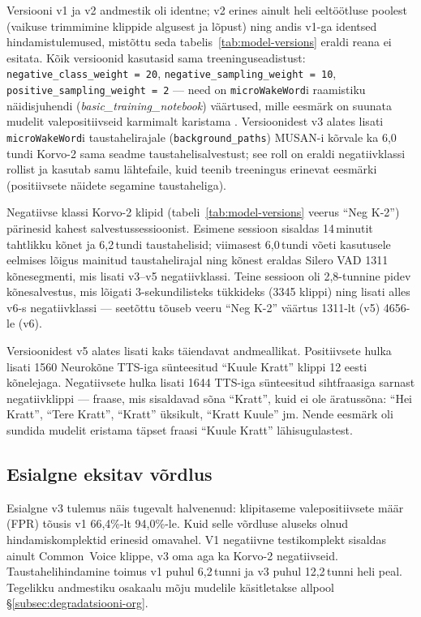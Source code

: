 Versiooni v1 ja v2 andmestik oli identne; v2 erines ainult heli eeltöötluse poolest (vaikuse trimmimine klippide algusest ja lõpust) ning andis v1-ga identsed hindamistulemused, mistõttu seda tabelis~\ref{tab:model-versions} eraldi reana ei esitata. Kõik versioonid kasutasid sama treeninguseadistust: \texttt{negative\_class\_weight\,=\,20}, \texttt{negative\_sampling\_weight\,=\,10}, \texttt{positive\_sampling\_weight\,=\,2} --- need on \texttt{microWakeWord}i raamistiku näidisjuhendi (\emph{basic\_training\_notebook}) väärtused, mille eesmärk on suunata mudelit valepositiivseid karmimalt karistama \cite{microwakeword2026}. Versioonidest v3 alates lisati \texttt{microWakeWord}i taustahelirajale (\texttt{background\_paths}) MUSAN-i kõrvale ka 6,0\,tundi Korvo-2 sama seadme taustahelisalvestust; see roll on eraldi negatiivklassi rollist ja kasutab samu lähtefaile, kuid teenib treeningus erinevat eesmärki (positiivsete näidete segamine taustaheliga).

Negatiivse klassi Korvo-2 klipid (tabeli~\ref{tab:model-versions} veerus \enquote{Neg K-2}) pärinesid kahest salvestussessioonist. Esimene sessioon sisaldas 14\,minutit tahtlikku kõnet ja 6,2\,tundi taustahelisid; viimasest 6,0\,tundi võeti kasutusele eelmises lõigus mainitud taustahelirajal ning kõnest eraldas Silero VAD 1311 kõnesegmenti, mis lisati v3--v5 negatiivklassi. Teine sessioon oli 2,8-tunnine pidev kõnesalvestus, mis lõigati 3-sekundilisteks tükkideks (3345 klippi) ning lisati alles v6-s negatiivklassi --- seetõttu tõuseb veeru \enquote{Neg K-2} väärtus 1311-lt (v5) 4656-le (v6).

Versioonidest v5 alates lisati kaks täiendavat andmeallikat. Positiivsete hulka lisati 1560 Neurokõne TTS-iga sünteesitud \enquote{Kuule Kratt} klippi 12 eesti kõnelejaga. Negatiivsete hulka lisati 1644 TTS-iga sünteesitud sihtfraasiga sarnast negatiivklippi --- fraase, mis sisaldavad sõna \enquote{Kratt}, kuid ei ole äratussõna: \enquote{Hei Kratt}, \enquote{Tere Kratt}, \enquote{Kratt} üksikult, \enquote{Kratt Kuule} jm. Nende eesmärk oli sundida mudelit eristama täpset fraasi \enquote{Kuule Kratt} lähisugulastest.

\subsection{Esialgne eksitav võrdlus}

Esialgne v3 tulemus näis tugevalt halvenenud: klipitaseme valepositiivsete määr (FPR) tõusis v1 66,4\%-lt 94,0\%-le. Kuid selle võrdluse aluseks olnud hindamiskomplektid erinesid omavahel. V1 negatiivne testikomplekt sisaldas ainult Common~Voice klippe, v3 oma aga ka Korvo-2 negatiivseid. Taustahelihindamine toimus v1 puhul 6,2\,tunni ja v3 puhul 12,2\,tunni heli peal. Tegelikku andmestiku osakaalu mõju mudelile käsitletakse allpool §\ref{subsec:degradatsiooni-org}.

